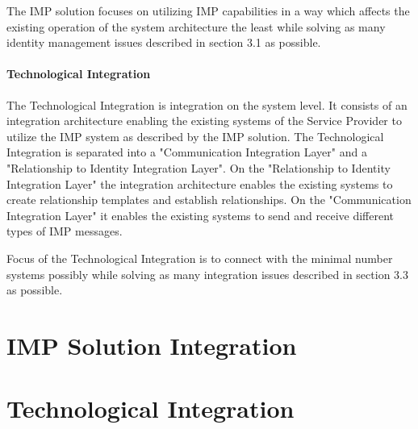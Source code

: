 The IMP solution focuses on utilizing IMP capabilities in a way which affects the existing operation of the system architecture the least while solving as many identity management issues described in section 3.1 as possible.

\paragraph{Technological Integration} 
The Technological Integration is integration on the system level. It consists of an integration architecture enabling the existing systems of the Service Provider to utilize the IMP system as described by the IMP solution. The Technological Integration is separated into a "Communication Integration Layer" and a "Relationship to Identity Integration Layer". On the "Relationship to Identity Integration Layer" the integration architecture enables the existing systems to create relationship templates and establish relationships. On the "Communication Integration Layer" it enables the existing systems to send and receive different types of IMP messages.

Focus of the Technological Integration is to connect with the minimal number systems possibly while solving as many integration issues described in section 3.3 as possible.

\section{IMP Solution Integration}



\section{Technological Integration}

